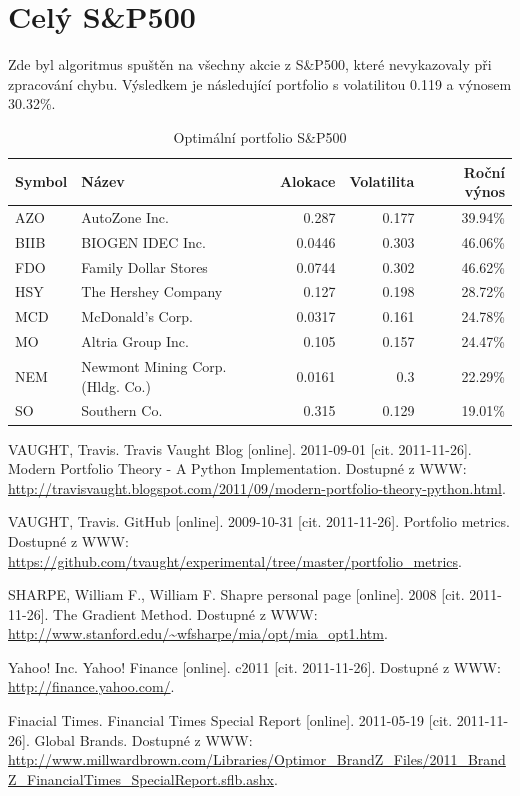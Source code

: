 \documentclass[a4paper,12pt]{report}
\begin{document}
  \clearpage
  \section{Celý S\&P500}
    Zde byl algoritmus spuštěn na všechny akcie z S\&P500, které nevykazovaly při zpracování chybu. Výsledkem je následující portfolio s volatilitou 0.119 a výnosem 30.32\%.

    \begin{table}[htb]
      \centering
      \begin{tabular}{|l|l|r|r|r|}
        \hline
        Symbol&Název&Alokace&Volatilita&Roční výnos\\\hline\hline
        AZO&AutoZone Inc. &0.287&0.177&39.94\%\\\hline
        BIIB&BIOGEN IDEC Inc. &0.0446&0.303&46.06\%\\\hline
        FDO&Family Dollar Stores &0.0744&0.302&46.62\%\\\hline
        HSY&The Hershey Company &0.127&0.198&28.72\%\\\hline
        MCD&McDonald's Corp. &0.0317&0.161&24.78\%\\\hline
        MO&Altria Group Inc. &0.105&0.157&24.47\%\\\hline
        NEM&Newmont Mining Corp. (Hldg. Co.) &0.0161&0.3&22.29\%\\\hline
        SO&Southern Co. &0.315&0.129&19.01\%\\\hline
      \end{tabular}
      \caption{Optimální portfolio S\&P500}
    \end{table}
\begin{thebibliography}{9}

VAUGHT, Travis. Travis Vaught Blog [online]. 2011-09-01 [cit. 2011-11-26]. Modern Portfolio Theory - A Python Implementation. Dostupné z WWW: \url{http://travisvaught.blogspot.com/2011/09/modern-portfolio-theory-python.html}.

VAUGHT, Travis. GitHub [online]. 2009-10-31 [cit. 2011-11-26]. Portfolio metrics. Dostupné z WWW: \url{https://github.com/tvaught/experimental/tree/master/portfolio_metrics}.

SHARPE, William F., William F. Shapre personal page [online]. 2008 [cit. 2011-11-26]. The Gradient Method. Dostupné z WWW: \url{http://www.stanford.edu/~wfsharpe/mia/opt/mia_opt1.htm}.

Yahoo! Inc. Yahoo! Finance [online]. c2011 [cit. 2011-11-26]. Dostupné z WWW: \url{http://finance.yahoo.com/}.

Finacial Times. Financial Times Special Report [online]. 2011-05-19 [cit. 2011-11-26]. Global Brands. Dostupné z WWW: \url{http://www.millwardbrown.com/Libraries/Optimor_BrandZ_Files/2011_BrandZ_FinancialTimes_SpecialReport.sflb.ashx}.
\end{thebibliography}
\end{document}
